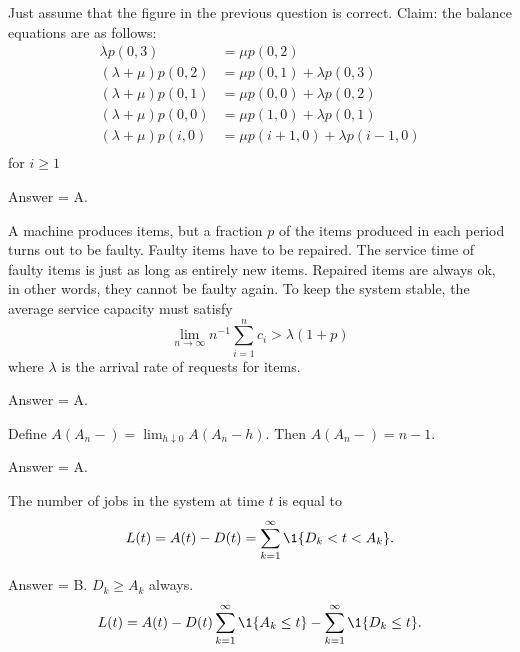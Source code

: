 \begin{exercise}[201807]
Just  assume that the  figure in the previous question is correct. Claim: the balance equations are as follows:
\begin{align*}
\lambda p(0,3) &= \mu p(0,2) \\
(\lambda+\mu) p(0,2) &= \mu p(0,1) + \lambda p(0,3)\\
(\lambda+\mu) p(0,1) &= \mu p(0,0) + \lambda p(0,2)\\
(\lambda+\mu) p(0,0) &= \mu p(1,0) + \lambda p(0,1)\\
(\lambda+\mu) p(i,0) &= \mu p(i+1,0) + \lambda p(i-1,0)\\
\end{align*}
for $i\geq 1$
\begin{solution}
Answer = A.
\end{solution}
\end{exercise}


\begin{exercise}[201902]
A machine produces items, but a fraction $p$ of the
items produced in each period turns out to be faulty. Faulty items have to be repaired. The service time of faulty items is just as long as entirely new items.
Repaired items are always ok, in other words, they cannot be faulty again.  To keep the system stable, the average service capacity must satisfy
  \begin{equation*}
\lim_{n\to \infty}   n^{-1}\sum_{i=1}^n c_i > \lambda (1+p)
\end{equation*}
where $\lambda$ is the arrival rate of requests for items. 
\begin{solution}
Answer = A.
\end{solution}
\end{exercise}

\begin{exercise}[201902]
Define $A(A_n-) = \lim_{h\downarrow 0} A(A_n - h)$. Then $A(A_n-) = n-1$. 

\begin{solution}
Answer = A.
\end{solution}
\end{exercise}

\begin{exercise}[201902]
The number of jobs in the system at time $t$ is equal to 
  \begin{equation*}
      L(t)= A(t) - D(t) = \sum_{k=1}^\infty \1{D_k < t < A_k}.
  \end{equation*}

\begin{solution}
Answer = B.  $D_k \geq A_k$ always. 
  \begin{equation*}
      L(t)= A(t) - D(t) \sum_{k=1}^\infty \1{A_k \leq t} -  \sum_{k=1}^\infty \1{D_k \leq t}.
  \end{equation*}
\end{solution}
\end{exercise}

